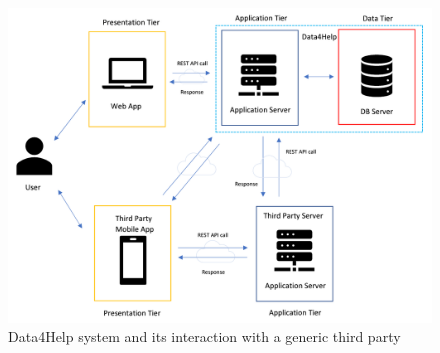 \documentclass[a4paper]{article}
\begin{document}
\begin{figure}[H]
    \centering
    \includegraphics[width=\linewidth]{architecturalDesign-data4help}
    \caption{Data4Help system and its interaction with a generic third party}
    \label{fig:my_label}
\end{figure}
\end{document}
